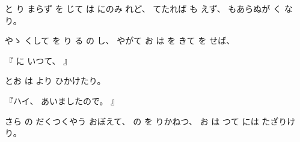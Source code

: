 %
と
り
まらず
を
じて
は
にのみ
れど、
%
てたれば
も
えず、
%
もあらぬが
く
なり。

%
やゝ
くして
を
り
る
の
し、
%
やがて
お
は
を
きて
を
せば、

%
『
に
いつて、
』

%
とお
は
より
ひかけたり。

%
『ハイ、
%
あいましたので。
』

%
さら
の
だくつくやう
おぼえて、
%
の
を
りかねつ、
%
お
は
つて
には
たざりけり。
